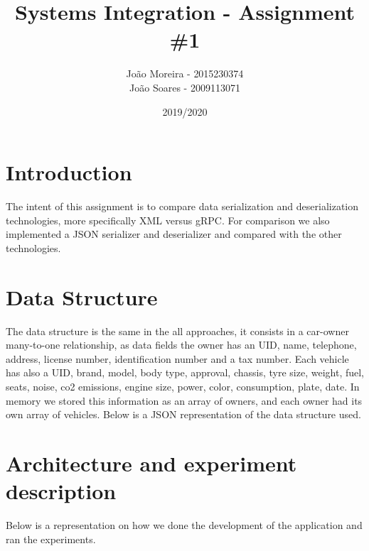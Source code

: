 \documentclass{article}
\title{Systems Integration - Assignment \#1}
\date{2019/2020}
\author{João Moreira - 2015230374 \\ 
João Soares - 2009113071 }
\begin{document}
\maketitle

\section{Introduction}

\qquad The intent of this assignment is to compare data serialization and deserialization technologies, more specifically  \ac{XML} versus \ac{gRPC}. For comparison we also implemented a \ac{JSON} serializer and deserializer and compared with the other technologies.

\section{Data Structure}

\qquad The data structure is the same in the all approaches, it consists in a car-owner many-to-one relationship, as data fields the owner has an \ac{UID}, name, telephone, address, license number, identification number and a tax number. Each vehicle has also a \ac{UID}, brand, model, body type, approval, chassis, tyre size, weight, fuel, seats, noise, co2 emissions, engine size, power, color, consumption, plate, date. In memory we stored this information as an array of owners, and each owner had its own array of vehicles. Below is a \ac{JSON} representation of the data structure used.

\section{Architecture and experiment description}

\qquad Below is a representation on how we done the development of the application and ran the experiments.
\end{document}
